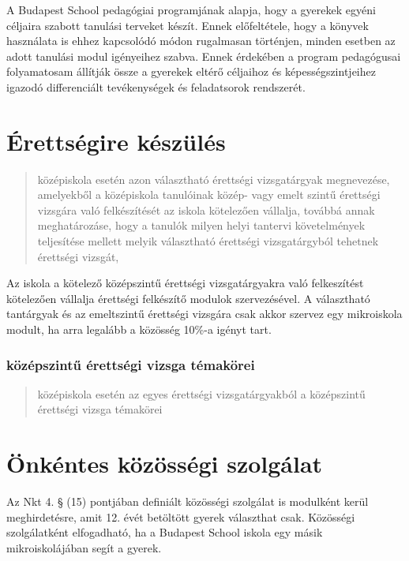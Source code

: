 A Budapest School pedagógiai programjának alapja, hogy a gyerekek egyéni
céljaira szabott tanulási terveket készít. Ennek előfeltétele, hogy a
könyvek használata is ehhez kapcsolódó módon rugalmasan történjen,
minden esetben az adott tanulási modul igényeihez szabva. Ennek
érdekében a program pedagógusai folyamatosam állítják össze a gyerekek
eltérő céljaihoz és képességszintjeihez igazodó differenciált
tevékenységek és feladatsorok rendszerét.

\section{Érettségire készülés }

\begin{quote}
      középiskola esetén azon választható érettségi vizsgatárgyak megnevezése,
      amelyekből a középiskola tanulóinak közép- vagy emelt szintű érettségi
      vizsgára való felkészítését az iskola kötelezően vállalja, továbbá annak
      meghatározáse, hogy a tanulók milyen helyi tantervi követelmények
      teljesítése mellett melyik választható érettségi vizsgatárgyból tehetnek
      érettségi vizsgát,
\end{quote}

Az iskola a kötelező középszintű érettségi vizsgatárgyakra való
felkeszítést kötelezően vállalja érettségi felkészítő modulok
szervezésével. A
választható tantárgyak és az emeltszintű érettségi vizsgára csak akkor
szervez egy mikroiskola modult, ha arra legalább a közösség 10\%-a
igényt tart.

\subsubsection{középszintű érettségi vizsga témakörei}

\begin{quote}
      középiskola esetén az egyes érettségi vizsgatárgyakból a középszintű
      érettségi vizsga témakörei
\end{quote}


\section{Önkéntes közösségi
  szolgálat}\label{uxf6nkuxe9ntes-kuxf6zuxf6ssuxe9gi-szolguxe1lat}

Az Nkt 4. § (15) pontjában definiált közösségi szolgálat is modulként
kerül meghirdetésre, amit 12. évét betöltött gyerek választhat csak.
Közösségi szolgálatként elfogadható, ha a Budapest School iskola egy
másik mikroiskolájában segít a gyerek.
